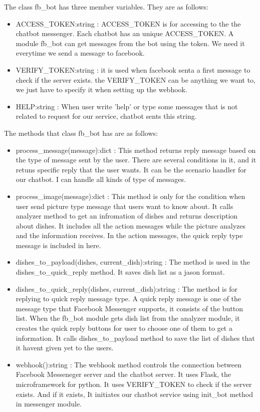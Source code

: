 The class fb\_bot has three member variables. They are as follows:

\begin{itemize}
\item ACCESS\_TOKEN:string : ACCESS\_TOKEN is for accessing to the the chatbot messenger. Each chatbot has an unique ACCESS\_TOKEN. A module fb\_bot can get messages from the bot using the token. We need it everytime we send a message to facebook. 
\item VERIFY\_TOKEN:string : it is used when facebook senta a first message to check if the server exists. the VERIFY\_TOKEN can be anything we want to, we just have to specify it when setting up the webhook.
\item HELP:string : When user write 'help' or type some messages that is not related to request for our service, chatbot sents this string.
\end{itemize} 

The methods that class fb\_bot has are as follows:

\begin{itemize}
\item process\_message(message):dict : This method returns reply message based on the type of message sent by the user. There are several conditions in it, and it retuns specific reply that the user wants. It can be the scenario handler for our chatbot. I can handle all kinds of type of messages.
\item process\_image(message):dict : This method is only for the condition when user send picture type message that users want to know about. It calls analyzer method to get an infromation of dishes and returns description about dishes. It includes all the action messages while the picture analyzes and the information receives. In the action messages, the quick reply type message is included in here. 
\item dishes\_to\_payload(dishes, current\_dish):string : The method is used in the dishes\_to\_quick\_reply method. It saves dish list as a jason format.
\item dishes\_to\_quick\_reply(dishes, current\_dish):string : The method is for replying to quick reply message type. A quick reply message is one of the message type that Facebook Messenger supports, it consists of the button list. When the fb\_bot module gets dish list from the analyzer module, it creates the quick reply buttons for user to choose one of them to get a information. It calls dishes\_to\_payload method to save the list of dishes that it havent given yet to the users.
\item webhook():string : The webhook method controls the connection between Facebook Messeneger server and the chatbot server. It uses Flask, the microframework for python. It uses VERIFY\_TOKEN to check if the server exists. And if it exists, It initiates our chatbot service using init\_bot method in messenger module.
\end{itemize} 

